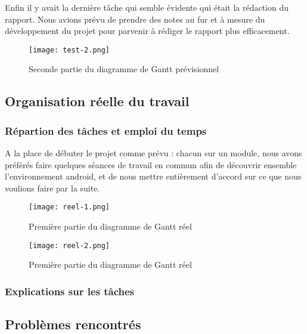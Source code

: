 \par
Enfin il y avait la dernière tâche qui semble évidente qui était la rédaction du rapport. Nous avions prévu de prendre des notes au fur et à mesure du développement du projet pour parvenir à rédiger le rapport plus efficacement.
\vfill
\begin{figure}[!h]
    \begin{center}
        \texttt{[image: test-2.png]}
        \caption{Seconde partie du diagramme de Gantt prévisionnel}
    \end{center}
\end{figure}






\subsection{Organisation réelle du travail}
\subsubsection{Répartion des tâches et emploi du temps}
    A la place de débuter le projet comme prévu : chacun sur un module, nous avons préférés faire quelques séances de travail en commun afin de découvrir ensemble l'environnement android, et de nous mettre entièrement d'accord sur ce que nous voulions faire par la suite.
\par
\vfill
\begin{figure}[!h]
    \begin{center}
        \texttt{[image: reel-1.png]}
        \caption{Première partie du diagramme de Gantt réel}
    \end{center}
\end{figure}
\vfill
\begin{figure}[!h]
    \begin{center}
        \texttt{[image: reel-2.png]}
        \caption{Première partie du diagramme de Gantt réel}
    \end{center}
\end{figure}
\subsubsection{Explications sur les tâches}




\subsection{Problèmes rencontrés}

